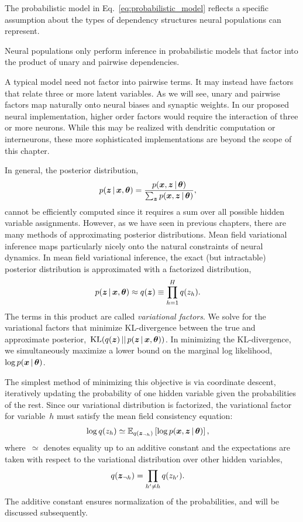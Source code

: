 The probabilistic model in Eq.~\ref{eq:probabilistic_model} reflects
a specific assumption about the types of dependency structures
neural populations can represent.

\begin{assumption}
  Neural populations only perform inference in probabilistic models
  that factor into the product of unary and pairwise dependencies. 
\end{assumption}

A typical model need not factor into pairwise terms. It may instead
have factors that relate three or more latent variables. As we will
see, unary and pairwise factors map naturally onto neural biases
and synaptic weights. In our proposed neural implementation, higher
order factors would require the interaction of three or more neurons.
While this may be realized with dendritic computation or interneurons,
these more sophisticated implementations are beyond the scope of this
chapter. 

In general, the posterior distribution,
\begin{align}
  p(\boldsymbol{z} \,|\, \boldsymbol{x}, \boldsymbol{\theta}) &=
  \frac{p(\boldsymbol{x}, \boldsymbol{z} \,|\, \boldsymbol{\theta})}
       {\sum_{\boldsymbol{z}} p(\boldsymbol{x}, \boldsymbol{z} \,|\, \boldsymbol{\theta})},
\end{align}
cannot be efficiently computed since it requires a sum over all
possible hidden variable assignments.
However, as we have seen in previous chapters, there are many methods of
approximating posterior distributions. Mean field variational
inference  maps particularly nicely onto the natural constraints
of neural dynamics. 
In mean field variational inference, the exact (but intractable)
posterior distribution is approximated with a factorized
distribution,
\begin{align}
  p(\boldsymbol{z} \,|\, \boldsymbol{x}, \boldsymbol{\theta}) &\approx q(\boldsymbol{z}) \equiv \prod_{h=1}^H q(z_h).
\end{align}
The terms in this product are called \emph{variational factors}.  We
solve for the variational factors that minimize KL-divergence between
the true and approximate posterior,~$\mathrm{KL}(q(\boldsymbol{z}) \,||\, p(\boldsymbol{z}
\,|\, \boldsymbol{x}, \boldsymbol{\theta}))$. In minimizing the KL-divergence, we
simultaneously maximize a lower bound on the marginal log
likelihood,~$\log p(\boldsymbol{x} \,|\, \boldsymbol{\theta})$.

The simplest method of minimizing this objective is via coordinate
descent, iteratively updating the probability of one hidden variable
given the probabilities of the rest. Since our variational
distribution is factorized, the variational factor for variable~$h$
must satisfy the mean field consistency equation:
\begin{align}
  \label{eq:mf_consistency}
  \log q(z_h) &\simeq \mathbb{E}_{q(\boldsymbol{z}_{\neg h})}
  \left[ \log p(\boldsymbol{x}, \boldsymbol{z} \,|\, \boldsymbol{\theta}) \right],
\end{align}
where~$\simeq$ denotes equality up to an additive constant and the
expectations are taken with respect to the variational
distribution over other hidden variables,
\begin{align}
  q(\boldsymbol{z}_{\neg h}) &= \prod_{h' \neq h} q(z_{h'}).
\end{align}
The additive constant
ensures normalization of the probabilities, and will be discussed
subsequently.  

